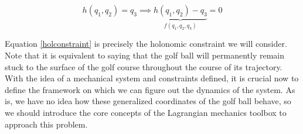 \begin{equation}
	h(q_1,q_2)=q_3 \implies \underbrace{h(q_1,q_2)-q_3}_{f(q_1,q_2,q_3)} = 0
	\label{holconstraint}
\end{equation}

Equation \ref{holconstraint} is precisely the holonomic constraint we will consider. Note that it is equivalent to saying that the golf ball will permanently remain stuck to the surface of the golf course throughout the course of its trajectory. With the idea of a mechanical system and constraints defined, it is crucial now to define the framework on which we can figure out the dynamics of the system. As is, we have no idea how these generalized coordinates of the golf ball behave, so we should introduce the core concepts of the Lagrangian mechanics toolbox to approach this problem.

